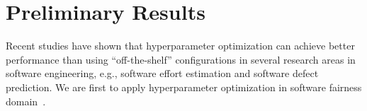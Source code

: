  

\section{Preliminary Results}\label{preliminary}


Recent studies have shown that hyperparameter optimization can achieve better performance than using ``off-the-shelf'' configurations in several research areas in software engineering, e.g., software effort estimation\cite{xia2018hyperparameter} and software defect prediction\cite{osman2017hyperparameter}. We are first to apply hyperparameter optimization in software fairness domain~\cite{Chakraborty}.



